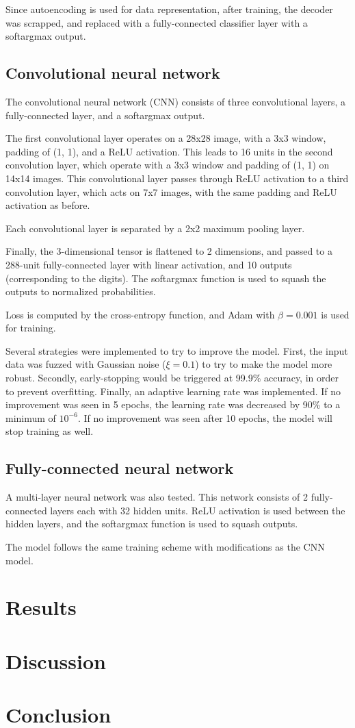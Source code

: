 \documentclass{article}
\begin{document}
Since autoencoding is used for data representation, after training,
the decoder was scrapped, and replaced with a fully-connected classifier layer with a softargmax output.

\subsection{Convolutional neural network}

The convolutional neural network (CNN) consists of three convolutional layers,
a fully-connected layer, and a softargmax output.

The first convolutional layer operates on a 28x28 image, with a 3x3 window,
padding of (1, 1), and a ReLU activation.
This leads to 16 units in the second convolution layer,
which operate with a 3x3 window and padding of (1, 1) on 14x14 images.
This convolutional layer passes through ReLU activation to a third convolution layer,
which acts on 7x7 images, with the same padding and ReLU activation as before.

Each convolutional layer is separated by a 2x2 maximum pooling layer.

Finally, the 3-dimensional tensor is flattened to 2 dimensions,
and passed to a 288-unit fully-connected layer with linear activation,
and 10 outputs (corresponding to the digits).
The softargmax function is used to squash the outputs to normalized probabilities.

Loss is computed by the cross-entropy function, and Adam with $\beta = 0.001$
is used for training.

Several strategies were implemented to try to improve the model.
First, the input data was fuzzed with Gaussian noise ($\xi = 0.1$)
to try to make the model more robust.
Secondly, early-stopping would be triggered at 99.9\% accuracy,
in order to prevent overfitting.
Finally, an adaptive learning rate was implemented.
If no improvement was seen in 5 epochs, the learning rate was decreased by 90\%
to a minimum of $10^{-6}$.
If no improvement was seen after 10 epochs, the model will stop training as well.

\subsection{Fully-connected neural network}

A multi-layer neural network was also tested.
This network consists of 2 fully-connected layers each with 32 hidden units.
ReLU activation is used between the hidden layers,
and the softargmax function is used to squash outputs.

The model follows the same training scheme with modifications as the CNN model.

\section{Results}

\section{Discussion}

\section{Conclusion}


\end{document}
